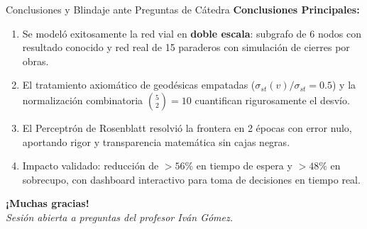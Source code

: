 \documentclass[aspectratio=169,10pt]{beamer}
\begin{document}
\begin{frame}{Conclusiones y Blindaje ante Preguntas de Cátedra}
    \textbf{Conclusiones Principales:}
    \begin{enumerate}
        \item Se modeló exitosamente la red vial en \textbf{doble escala}: subgrafo de 6 nodos con resultado conocido y red real de 15 paraderos con simulación de cierres por obras.
        \item El tratamiento axiomático de geodésicas empatadas ($\sigma_{st}(v)/\sigma_{st} = 0.5$) y la normalización combinatoria $\binom{5}{2}=10$ cuantifican rigurosamente el desvío.
        \item El Perceptrón de Rosenblatt resolvió la frontera en 2 épocas con error nulo, aportando rigor y transparencia matemática sin cajas negras.
        \item Impacto validado: reducción de $>56\%$ en tiempo de espera y $>48\%$ en sobrecupo, con dashboard interactivo para toma de decisiones en tiempo real.
    \end{enumerate}

    \vspace{0.2cm}
    \begin{center}
        \textbf{\large ¡Muchas gracias!} \\
        \textit{Sesión abierta a preguntas del profesor Iván Gómez.}
    \end{center}
\end{frame}
\end{document}
